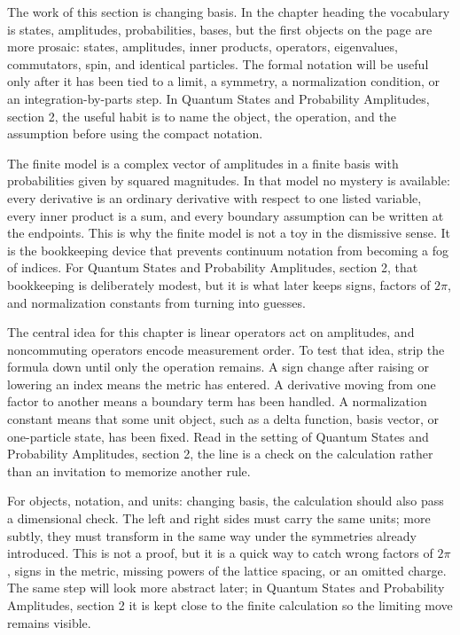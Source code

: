 The work of this section is changing basis.  In the chapter heading the vocabulary is states, amplitudes, probabilities, bases, but the first objects on the page are more prosaic: states, amplitudes, inner products, operators, eigenvalues, commutators, spin, and identical particles.  The formal notation will be useful only after it has been tied to a limit, a symmetry, a normalization condition, or an integration-by-parts step.  In Quantum States and Probability Amplitudes, section 2, the useful habit is to name the object, the operation, and the assumption before using the compact notation.

The finite model is a complex vector of amplitudes in a finite basis with probabilities given by squared magnitudes.  In that model no mystery is available: every derivative is an ordinary derivative with respect to one listed variable, every inner product is a sum, and every boundary assumption can be written at the endpoints.  This is why the finite model is not a toy in the dismissive sense.  It is the bookkeeping device that prevents continuum notation from becoming a fog of indices.  For Quantum States and Probability Amplitudes, section 2, that bookkeeping is deliberately modest, but it is what later keeps signs, factors of \(2\pi\), and normalization constants from turning into guesses.

The central idea for this chapter is linear operators act on amplitudes, and noncommuting operators encode measurement order.  To test that idea, strip the formula down until only the operation remains.  A sign change after raising or lowering an index means the metric has entered.  A derivative moving from one factor to another means a boundary term has been handled.  A normalization constant means that some unit object, such as a delta function, basis vector, or one-particle state, has been fixed.  Read in the setting of Quantum States and Probability Amplitudes, section 2, the line is a check on the calculation rather than an invitation to memorize another rule.

For objects, notation, and units: changing basis, the calculation should also pass a dimensional check.  The left and right sides must carry the same units; more subtly, they must transform in the same way under the symmetries already introduced.  This is not a proof, but it is a quick way to catch wrong factors of \(2\pi\), signs in the metric, missing powers of the lattice spacing, or an omitted charge.  The same step will look more abstract later; in Quantum States and Probability Amplitudes, section 2 it is kept close to the finite calculation so the limiting move remains visible.

